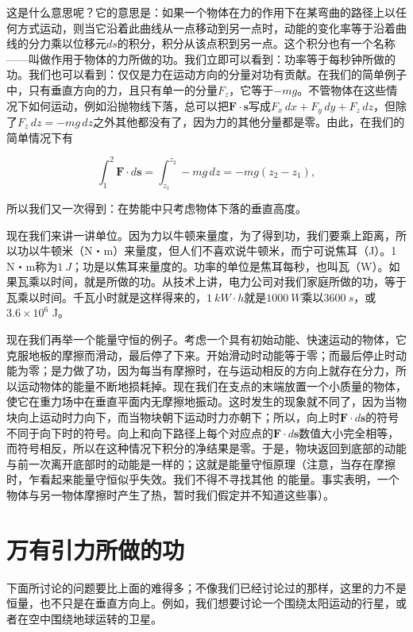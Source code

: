 \documentclass[12pt,oneside]{book}
\providecommand{\FLPvec}[1]{\boldsymbol{#1}}
\providecommand{\FLPF}[0]{\FLPvec{F}}
\providecommand{\FLPs}[0]{\FLPvec{s}}
\begin{document}
这是什么意思呢？它的意思是：如果一个物体在力的作用下在某弯曲的路径上以任何方式运动，则当它沿着此曲线从一点移动到另一点时，动能的变化率等于沿着曲线的分力乘以位移元$ds$的积分，积分从该点积到另一点。这个积分也有一个名称——叫做作用于物体的力所做的功。我们立即可以看到：功率等于每秒钟所做的功。我们也可以看到：仅仅是力在运动方向的分量对功有贡献。在我们的简单例子中，只有垂直方向的力，且只有单一的分量$F_{z}$，它等于$-mg$。不管物体在这些情况下如何运动，例如沿抛物线下落，总可以把$\FLPF\cdot\FLPs$写成$F_x\,dx + F_y\,dy + F_z\,dz$，但除了$F_z\,dz = -mg\,dz$之外其他都没有了，因为力的其他分量都是零。由此，在我们的简单情况下有


\begin{equation}
\label{Eq:I:13:10}
\int_1^2\FLPF\cdot d\FLPs=\int_{z_1}^{z_2}-mg\,dz=-mg(z_2-z_1),
\end{equation}

所以我们又一次得到：在势能中只考虑物体下落的垂直高度。


现在我们来讲一讲单位。因为力以牛顿来量度，为了得到功，我们要乘上距离，所以功以牛顿米（N・m）来量度，但人们不喜欢说牛顿米，而宁可说焦耳（J）。1 N・m称为$1\ J$；功是以焦耳来量度的。功率的单位是焦耳每秒，也叫瓦（W）。如果瓦乘以时间，就是所做的功。从技术上讲，电力公司对我们家庭所做的功，等于瓦乘以时间。千瓦小时就是这样得来的，$1\ kW · h$就是$1000\ W$乘以$3600\ s$，或$3.6\times10^6 $ J。


现在我们再举一个能量守恒的例子。考虑一个具有初始动能、快速运动的物体，它克服地板的摩擦而滑动，最后停了下来。开始滑动时动能等于零；而最后停止时动能为零；是力做了功，因为每当有摩擦时，在与运动相反的方向上就存在分力，所以运动物体的能量不断地损耗掉。现在我们在支点的末端放置一个小质量的物体，使它在重力场中在垂直平面内无摩擦地振动。这时发生的现象就不同了，因为当物块向上运动时力向下，而当物块朝下运动时力亦朝下；所以，向上时$\FLPF\cdot d\FLPs$的符号不同于向下时的符号。向上和向下路径上每个对应点的$\FLPF\cdot d\FLPs$数值大小完全相等，而符号相反，所以在这种情况下积分的净结果是零。于是，物块返回到底部的动能与前一次离开底部时的动能是一样的；这就是能量守恒原理（注意，当存在摩擦时，乍看起来能量守恒似乎失效。我们不得不寻找其他  的能量。事实表明，一个物体与另一物体摩擦时产生了热，暂时我们假定并不知道这些事）。


\section{万有引力所做的功}
下面所讨论的问题要比上面的难得多；不像我们已经讨论过的那样，这里的力不是恒量，也不只是在垂直方向上。例如，我们想要讨论一个围绕太阳运动的行星，或者在空中围绕地球运转的卫星。
\end{document}
